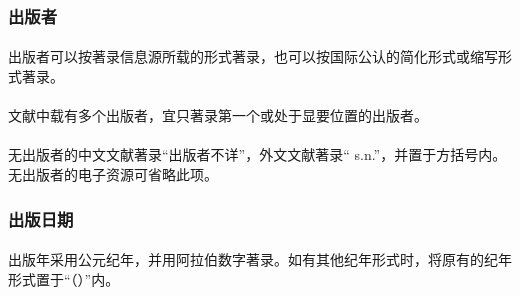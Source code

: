 \documentclass{article}
\begin{document}
\subsubsection{出版者}

\paragraph{} 出版者可以按著录信息源所载的形式著录，也可以按国际公认的简化形式或缩写形式著录。

\begin{refsection}
\nocite{egbookpubpublishera--}
\nocite{egbookpubpublisherb--}
\nocite{egbookpubpublisherc--}

{}
\end{refsection}

\paragraph{} 文献中载有多个出版者，宜只著录第一个或处于显要位置的出版者。


\begin{refsection}
\nocite{egbookpubpublisherd--}

{}
\end{refsection}

\paragraph{} 无出版者的中文文献著录“出版者不详”，外文文献著录“ s.n.”，并置于方括号内。无出版者的电子资源可省略此项。

\begin{refsection}

\nocite{egbookpubpublishere--}
\nocite{egbookpubpublisherf--}

{}
\end{refsection}



\subsubsection{出版日期}

\paragraph{} 出版年采用公元纪年，并用阿拉伯数字著录。如有其他纪年形式时，将原有的纪年形式置于“（\space  ）”内。
\end{document}
